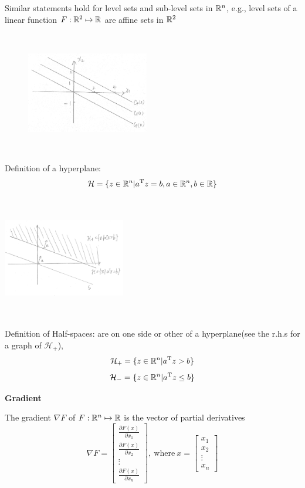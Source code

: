 Similar statements hold for level sets and sub-level sets in $\mathbb{R}^{n}$, e.g., level sets of a linear function $F:\mathbb{R}^{2}\mapsto\mathbb{R}$ are affine sets in $\mathbb{R}^{2}$

\begin{figure}
	\centering
	\includegraphics[width=2.1in,height=2.1in]{figures/ch02/p50-3.jpg}
\end{figure}

\vspace{0.3cm}
Definition of a hyperplane:
$$\mathcal{H}=\{z\in\mathbb{R}^{n}|a^{{\rm T}} z=b,a\in\mathbb{R}^{n}, b\in\mathbb{R} \}$$

\begin{marginfigure}
	\centering
	\includegraphics[width=2.1in,height=2.1in]{figures/ch02/p53.jpg}
	\label{fig:graph} 
\end{marginfigure}

Definition of Half-spaces: are on one side or other of a hyperplane(see the r.h.s for a graph of $\mathcal{H}_{+}$),
$$\mathcal{H}_{+}=\{z\in\mathbb{R}^{n}|a^{{\rm T}} z>b\}$$
$$\mathcal{H}_{-}=\{z\in\mathbb{R}^{n}|a^{{\rm T}} z\leq b\}$$



\vspace{0.5cm}

\textbf{Gradient}

The gradient $\nabla F$ of $F:\mathbb{R}^{n}\mapsto\mathbb{R}$ is the vector of partial derivatives
$$\nabla F= 
\left[ 
\begin{array}{c} 
\frac{\partial F(x)}{\partial x_{1}} \\
\frac{\partial F(x)}{\partial x_{2}} \\
\vdots \\
\frac{\partial F(x)}{\partial x_{n}}
\end{array}
\right],
\ \text{where}\ x= 
\left[ 
\begin{array}{c} 
x_{1} \\
x_{2} \\
\vdots \\
x_{n}
\end{array}
\right]$$

